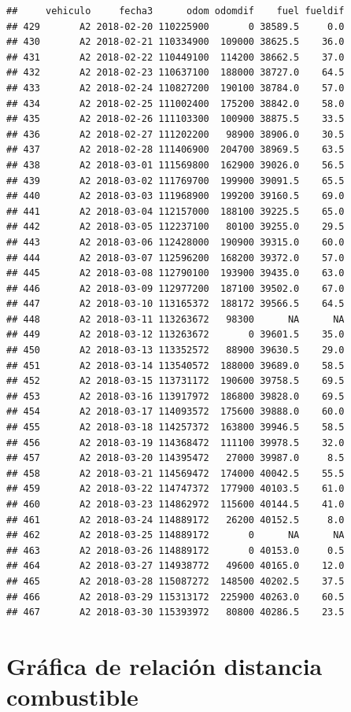 \documentclass[]{article}
\begin{document}
\begin{verbatim}
##     vehiculo     fecha3      odom odomdif    fuel fueldif
## 429       A2 2018-02-20 110225900       0 38589.5     0.0
## 430       A2 2018-02-21 110334900  109000 38625.5    36.0
## 431       A2 2018-02-22 110449100  114200 38662.5    37.0
## 432       A2 2018-02-23 110637100  188000 38727.0    64.5
## 433       A2 2018-02-24 110827200  190100 38784.0    57.0
## 434       A2 2018-02-25 111002400  175200 38842.0    58.0
## 435       A2 2018-02-26 111103300  100900 38875.5    33.5
## 436       A2 2018-02-27 111202200   98900 38906.0    30.5
## 437       A2 2018-02-28 111406900  204700 38969.5    63.5
## 438       A2 2018-03-01 111569800  162900 39026.0    56.5
## 439       A2 2018-03-02 111769700  199900 39091.5    65.5
## 440       A2 2018-03-03 111968900  199200 39160.5    69.0
## 441       A2 2018-03-04 112157000  188100 39225.5    65.0
## 442       A2 2018-03-05 112237100   80100 39255.0    29.5
## 443       A2 2018-03-06 112428000  190900 39315.0    60.0
## 444       A2 2018-03-07 112596200  168200 39372.0    57.0
## 445       A2 2018-03-08 112790100  193900 39435.0    63.0
## 446       A2 2018-03-09 112977200  187100 39502.0    67.0
## 447       A2 2018-03-10 113165372  188172 39566.5    64.5
## 448       A2 2018-03-11 113263672   98300      NA      NA
## 449       A2 2018-03-12 113263672       0 39601.5    35.0
## 450       A2 2018-03-13 113352572   88900 39630.5    29.0
## 451       A2 2018-03-14 113540572  188000 39689.0    58.5
## 452       A2 2018-03-15 113731172  190600 39758.5    69.5
## 453       A2 2018-03-16 113917972  186800 39828.0    69.5
## 454       A2 2018-03-17 114093572  175600 39888.0    60.0
## 455       A2 2018-03-18 114257372  163800 39946.5    58.5
## 456       A2 2018-03-19 114368472  111100 39978.5    32.0
## 457       A2 2018-03-20 114395472   27000 39987.0     8.5
## 458       A2 2018-03-21 114569472  174000 40042.5    55.5
## 459       A2 2018-03-22 114747372  177900 40103.5    61.0
## 460       A2 2018-03-23 114862972  115600 40144.5    41.0
## 461       A2 2018-03-24 114889172   26200 40152.5     8.0
## 462       A2 2018-03-25 114889172       0      NA      NA
## 463       A2 2018-03-26 114889172       0 40153.0     0.5
## 464       A2 2018-03-27 114938772   49600 40165.0    12.0
## 465       A2 2018-03-28 115087272  148500 40202.5    37.5
## 466       A2 2018-03-29 115313172  225900 40263.0    60.5
## 467       A2 2018-03-30 115393972   80800 40286.5    23.5
\end{verbatim}

\section{Gráfica de relación distancia
combustible}\label{grafica-de-relacion-distancia-combustible}
\end{document}
